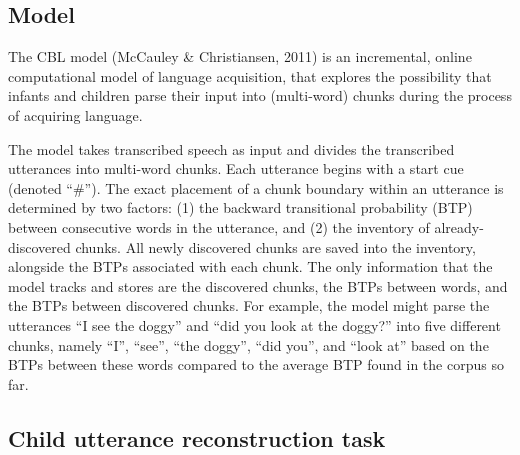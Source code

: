 \documentclass[man,mask,floatsintext]{apa6}
\begin{document}
\subsection{Model}\label{model}

The CBL model (McCauley \& Christiansen, 2011) is an incremental, online
computational model of language acquisition, that explores the
possibility that infants and children parse their input into
(multi-word) chunks during the process of acquiring language.

The model takes transcribed speech as input and divides the transcribed
utterances into multi-word chunks. Each utterance begins with a start
cue (denoted \enquote{\#}). The exact placement of a chunk boundary
within an utterance is determined by two factors: (1) the backward
transitional probability (BTP) between consecutive words in the
utterance, and (2) the inventory of already-discovered chunks. All newly
discovered chunks are saved into the inventory, alongside the BTPs
associated with each chunk. The only information that the model tracks
and stores are the discovered chunks, the BTPs between words, and the
BTPs between discovered chunks. For example, the model might parse the
utterances \enquote{I see the doggy} and \enquote{did you look at the
doggy?} into five different chunks, namely \enquote{I}, \enquote{see},
\enquote{the doggy}, \enquote{did you}, and \enquote{look at} based on
the BTPs between these words compared to the average BTP found in the
corpus so far.

\subsection{Child utterance reconstruction
task}\label{child-utterance-reconstruction-task}
\end{document}
